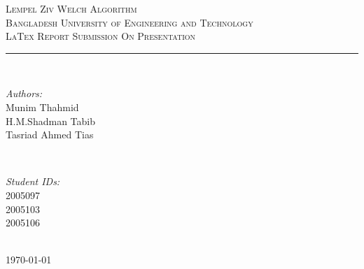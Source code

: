 \documentclass[12pt, a4paper]{article}
\date{\vspace{-5ex}\today} %
\begin{document}
\begin{titlepage}
    \centering
    \vspace*{1 cm}
    
    \textsc{\LARGE Lempel Ziv Welch Algorithm}\\[1.5 cm] %
    \textsc{\Large Bangladesh University of Engineering and Technology}\\[0.5 cm] %
    \textsc{\large LaTex Report Submission On Presentation}\\[0.5 cm] %
    


    \rule{\linewidth}{0.2 mm} \\[1.5 cm]
    
    \begin{minipage}{0.4\textwidth}
        \begin{flushleft} \large
            \emph{Authors:}\\
            Munim Thahmid\\ %
            H.M.Shadman Tabib\\ %
            Tasriad Ahmed Tias
        \end{flushleft}
    \end{minipage}
    ~
    \begin{minipage}{0.4\textwidth}
        \begin{flushright} \large
            \emph{Student IDs:} \\
            2005097 \\ %
            2005103\\ %
            2005106
        \end{flushright}
    \end{minipage}\\[2 cm]
    
{\large \today\vspace{2cm}}
    
    \vfill %
\end{titlepage}

\tableofcontents
\newpage

\listoffigures

\listoftables
\newpage

\end{document}
